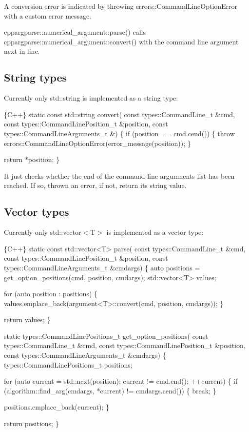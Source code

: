 A conversion error is indicated by throwing {\ttfamily errors\+::\+Command\+Line\+Option\+Error} with a custom error message.

{\ttfamily cppargparse\+::numerical\+\_\+argument\+::parse()} calls {\ttfamily cppargparse\+::numerical\+\_\+argument\+::convert()} with the command line argument next in line.

\subsection*{String types}

Currently only {\ttfamily std\+::string} is implemented as a string type\+: 
\begin{DoxyCode}
\{C++\}
static const std::string convert(
        const types::CommandLine\_t &cmd,
        const types::CommandLinePosition\_t &position,
        const types::CommandLineArguments\_t &)
\{
    if (position == cmd.cend())
    \{
        throw errors::CommandLineOptionError(error\_message(position));
    \}

    return *position;
\}
\end{DoxyCode}


It just checks whether the end of the command line argumnents list has been reached. If so, thrown an error, if not, return its string value.

\subsection*{Vector types}

Currently only {\ttfamily std\+::vector$<$T$>$} is implemented as a vector type\+: 
\begin{DoxyCode}
\{C++\}
static const std::vector<T> parse(
        const types::CommandLine\_t &cmd,
        const types::CommandLinePosition\_t &position,
        const types::CommandLineArguments\_t &cmdargs)
\{
    auto positions = get\_option\_positions(cmd, position, cmdargs);
    std::vector<T> values;

    for (auto position : positions)
    \{
        values.emplace\_back(argument<T>::convert(cmd, position, cmdargs));
    \}

    return values;
\}


static types::CommandLinePositions\_t get\_option\_positions(
        const types::CommandLine\_t &cmd,
        const types::CommandLinePosition\_t &position,
        const types::CommandLineArguments\_t &cmdargs)
\{
    types::CommandLinePositions\_t positions;

    for (auto current = std::next(position); current != cmd.end(); ++current)
    \{
        if (algorithm::find\_arg(cmdargs, *current) != cmdargs.cend())
        \{
            break;
        \}

        positions.emplace\_back(current);
    \}

    return positions;
\}
\end{DoxyCode}


